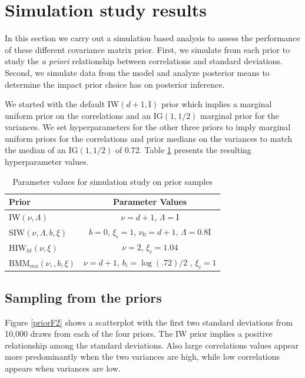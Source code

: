 \documentclass[12pt]{article}
\newcommand{\I}{\mathrm{I}}
\begin{document}
\section{Simulation study results \label{sec:results}}

In this section we carry out a simulation based analysis to assess the performance of these different covariance matrix prior. First, we simulate from each prior to study the \emph{a priori} relationship between correlations and standard deviations. Second, we simulate data from the model and analyze posterior means to determine the impact prior choice has on posterior inference.

We started with the default IW$(d+1,\I)$ prior which implies a marginal uniform prior on the correlations and an IG$(1,1/2)$ marginal prior for the variances. We set hyperparameters for the other three priors to imply marginal uniform priors for the correlations and prior medians on the variances to match the median of an IG$(1,1/2)$ of 0.72. Table \ref{paramvals} presents the resulting hyperparameter values.   

\begin{table}[htbp]
   \centering
    \caption{ Parameter values for simulation study on prior samples}
   \label{paramvals} 
   \begin{tabular}{ l|c}
   \hline
      Prior    &  Parameter Values \\ \hline
  IW$(\nu, \Lambda)$ &   $\nu=d+1$, $\Lambda=\I$ \\ 
  SIW$(\nu, \Lambda, b, \xi)$  & $b=0$, $\xi_i =1$,  $\nu_0= d + 1$, $\Lambda = 0.8\I$ \\
  HIW$_{ht}(\nu, \xi)$    &  $\nu=2$,  $\xi_i=1.04$ \\
   BMM$_{mu}(\nu,,b,\xi)$   &  $\nu=d+1$, $b_i=\log(.72)/2$ , $\xi_i=1$ \\ \hline
   \end{tabular}
 \end{table}       


\subsection{Sampling from the priors} 

Figure \ref{priorF2} shows a scatterplot with the first two standard deviations from 10,000 draws from each of the four priors. The IW prior implies a positive relationship among the standard deviations. Also large correlations values appear more predominantly when the two variances are high, while low correlations appears when variances are low. 
\end{document}
